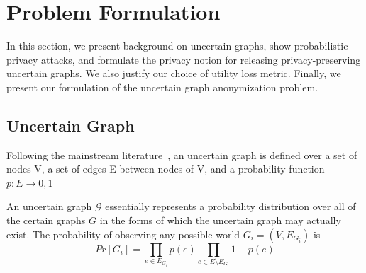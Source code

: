 \section{Problem Formulation}
\label{sec:notation}

In this section, we present background on uncertain graphs, show probabilistic privacy attacks, and formulate the privacy notion for releasing privacy-preserving uncertain graphs. We also justify our choice of utility loss metric. Finally, we present our formulation of the uncertain graph anonymization problem. 

\subsection{Uncertain Graph}
Following the mainstream literature~\cite{Potamias_K_2010,Zhao_Detecting_2014,Colbourn_Colbourn_1987}, an uncertain graph is defined over a set of nodes V, a set of edges E between nodes of V, and a probability function $\mathit{p}: E \longrightarrow 0,1 $

An uncertain graph $\mathcal{G}$ essentially represents a probability distribution over all of the certain graphs $G$ in the forms of which the uncertain graph may actually exist. 
The probability of observing any possible world $G_i=(V,E_{G_i})$ is    
\begin{equation*}
    Pr[G_i]=\prod_{e \in E_{G_i}} {\mathit{p}(e)} \prod_{e \in E \setminus E_{G_i}} 1-\mathit{p}(e)
\end{equation*}

